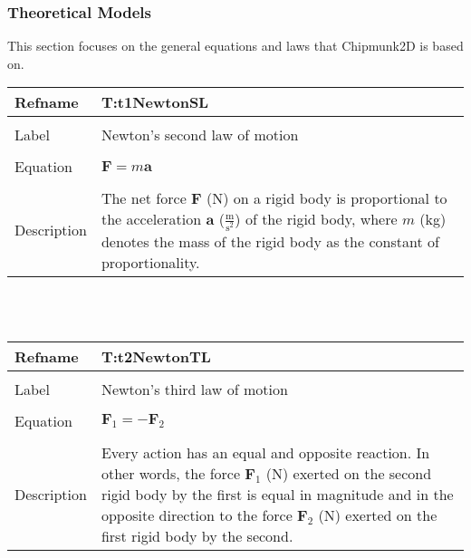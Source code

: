 \documentclass[12pt]{article}
\begin{document}
\subsubsection{Theoretical Models}
\label{Sec:TheoMode}
This section focuses on the general equations and laws that Chipmunk2D is based on.
~\newline
\noindent \begin{minipage}{\textwidth}
\begin{tabular}{p{} p{}}
\toprule \textbf{Refname} & \textbf{T:t1NewtonSL}
\label{T:t1NewtonSL}
\\ \midrule \\
Label & Newton's second law of motion
\\ \midrule \\
Equation & $\mathbf{F}=m\mathbf{a}$
\\ \midrule \\
Description & The net force $\mathbf{F}$ (N) on a rigid body is proportional to the acceleration $\mathbf{a}$ ($\frac{\text{m}}{\text{s}^{2}}$) of the rigid body, where $m$ (kg) denotes the mass of the rigid body as the constant of proportionality.
\\ \bottomrule \end{tabular}
\end{minipage}\\
~\newline
\noindent \begin{minipage}{\textwidth}
\begin{tabular}{p{} p{}}
\toprule \textbf{Refname} & \textbf{T:t2NewtonTL}
\label{T:t2NewtonTL}
\\ \midrule \\
Label & Newton's third law of motion
\\ \midrule \\
Equation & $\mathbf{F}_{1}=-\mathbf{F}_{2}$
\\ \midrule \\
Description & Every action has an equal and opposite reaction. In other words, the force $\mathbf{F}_{1}$ (N) exerted on the second rigid body by the first is equal in magnitude and in the opposite direction to the force $\mathbf{F}_{2}$ (N) exerted on the first rigid body by the second.
\\ \bottomrule \end{tabular}
\end{minipage}\\
~\newline
\end{document}
